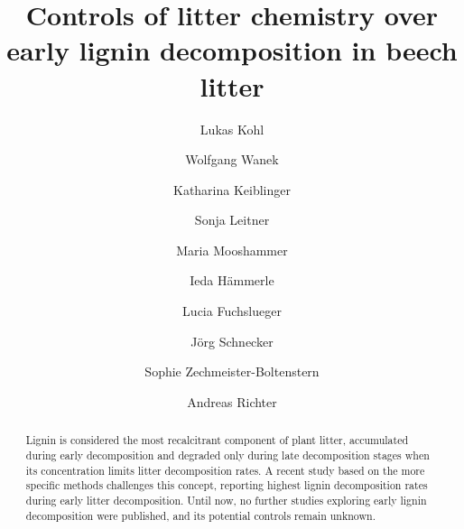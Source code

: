 \documentclass[authoryear,preprint,review,12pt]{elsarticle}
\begin{document}
\begin{frontmatter}



\title{Controls of litter chemistry over early lignin decomposition in beech litter}


\author[1]{Lukas Kohl}
\author[1]{Wolfgang Wanek}
\author[2]{Katharina Keiblinger}
\author[1]{Sonja Leitner}
\author[1]{Maria Mooshammer}
\author[1]{Ieda H\"ammerle}
\author[1]{Lucia Fuchslueger}
\author[1]{J\"org Schnecker}
\author[2]{Sophie Zechmeister-Boltenstern}
\author[1]{Andreas Richter}

\address[1]{Department of Chemical Ecology and Ecosystem Research, University of Vienna, Althanstra\ss e 14, A-1090 Vienna, Austria}
\address[2]{Federal Research and Training Centre for Forests, Natural Hazards and Landscape, Department of Soil Biology, Seckendorff-Gudent-Weg 8, A-1131 Vienna, Austria}

\begin{abstract}
Lignin is considered the most recalcitrant component of plant litter, accumulated during early decomposition and degraded only during late decomposition stages when its concentration limits litter decomposition rates. A recent study based on the more specific methods challenges this concept, reporting highest lignin decomposition rates during early litter decomposition. Until now, no further studies exploring early lignin decomposition were published, and its potential controls remain unknown.


\end{abstract}
\end{frontmatter}
\end{document}
